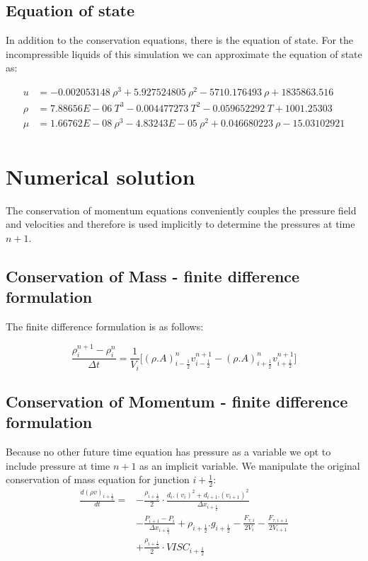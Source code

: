 \documentclass[11pt,letterpaper,titlepage]{article}
\newcommand{\half}{\frac{1}{2}}
\begin{document}
\subsection{Equation of state}
In addition to the conservation equations, there is the equation of state. For the incompressible liquids of this simulation we can approximate the equation of state as:

\begin{equation}
\begin{aligned}
u&=-0.002053148 \ \rho^3+5.927524805 \ \rho^2-5710.176493 \ \rho+1835863.516 \\
\rho&=7.88656E-06 \ T^3-0.004477273 \ T^2-0.059652292 \ T+1001.25303\\
\mu&=1.66762E-08 \ \rho^3-4.83243E-05 \ \rho^2+0.046680223 \ \rho-15.03102921\\
\end{aligned}
\end{equation}






\newpage
{}
\section{Numerical solution}
The conservation of momentum equations conveniently couples the pressure field and velocities and therefore is used implicitly to determine the pressures at time $n+1$.

\subsection{Conservation of Mass - finite difference formulation}
The finite difference formulation is as follows:


\begin{equation}
\frac{\rho_i^{n+1} - \rho_i^{n}}{\Delta t} = \frac{1}{V_i}\biggr[ (\rho.A)_{i-\half}^{n}v_{i-\half}^{n+1}-(\rho.A)_{i+\half}^{n} v_{i+\half}^{n+1} \biggr]
\end{equation}




\subsection{Conservation of Momentum - finite difference formulation}
Because no other future time equation has pressure as a variable we opt to include pressure at time $n+1$ as an implicit variable. We manipulate the original conservation of mass equation for junction $i+\half$:
\begin{equation*}
\begin{aligned}
\frac{d(\rho v)_{i+\half}}{dt}=&-\frac{\rho_{i+\half}}{2}\cdot\frac{d_i.(v_{i})^2+d_{i+1}.(v_{i+1})^2}{\Delta x_{i+\half}} \\
&-\frac{P_{i+1}-P_i}{\Delta x_{i+\half}} + \rho_{i+\half}.g_{i+\half}-\frac{F_{\tau,i}}{2V_i}-\frac{F_{\tau,i+1}}{2V_{i+1}} \\
&+\frac{\rho_{i+\half}}{2}\cdot VISC_{i+\half}
\end{aligned}
\end{equation*}
\end{document}
